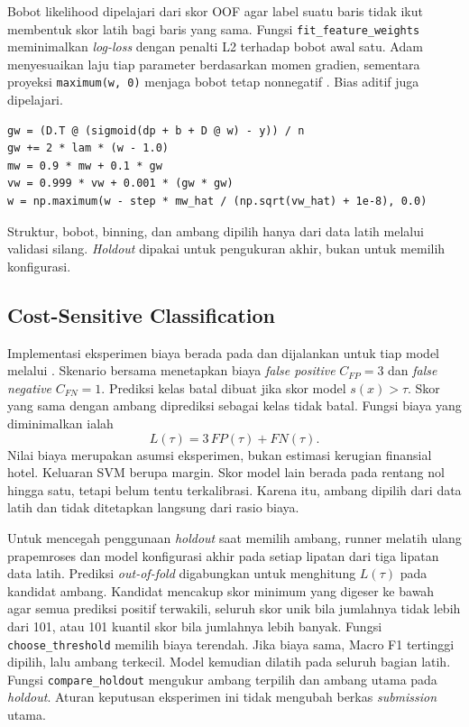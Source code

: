 Bobot likelihood dipelajari dari skor OOF agar label suatu baris tidak ikut
membentuk skor latih bagi baris yang sama. Fungsi \texttt{fit\_feature\_weights}
meminimalkan \textit{log-loss} dengan penalti L2 terhadap bobot awal satu.
Adam menyesuaikan laju tiap parameter berdasarkan momen gradien, sementara
proyeksi \texttt{maximum(w, 0)} menjaga bobot tetap nonnegatif
\cite{zaidi2013alleviating}. Bias aditif juga dipelajari.

\begin{lstlisting}[caption={Pembaruan bobot likelihood KDB dengan Adam},label={lst-nb-adam}]
gw = (D.T @ (sigmoid(dp + b + D @ w) - y)) / n
gw += 2 * lam * (w - 1.0)
mw = 0.9 * mw + 0.1 * gw
vw = 0.999 * vw + 0.001 * (gw * gw)
w = np.maximum(w - step * mw_hat / (np.sqrt(vw_hat) + 1e-8), 0.0)
\end{lstlisting}

Struktur, bobot, binning, dan ambang dipilih hanya dari data latih melalui
validasi silang. \textit{Holdout} dipakai untuk pengukuran akhir, bukan
untuk memilih konfigurasi.

\newpage
\subsection{Cost-Sensitive Classification}
\label{sec:implementasi-cost-sensitive}

Implementasi eksperimen biaya berada pada  dan dijalankan untuk tiap model melalui . Skenario bersama menetapkan biaya \textit{false positive} $C_{FP}=3$ dan \textit{false negative} $C_{FN}=1$. Prediksi kelas batal dibuat jika skor model $s(x)>\tau$. Skor yang sama dengan ambang diprediksi sebagai kelas tidak batal. Fungsi biaya yang diminimalkan ialah
\begin{equation}
    L(\tau)=3\,FP(\tau)+FN(\tau).
\end{equation}
Nilai biaya merupakan asumsi eksperimen, bukan estimasi kerugian finansial hotel. Keluaran SVM berupa margin. Skor model lain berada pada rentang nol hingga satu, tetapi belum tentu terkalibrasi. Karena itu, ambang dipilih dari data latih dan tidak ditetapkan langsung dari rasio biaya.

Untuk mencegah penggunaan \textit{holdout} saat memilih ambang, runner melatih ulang prapemroses dan model konfigurasi akhir pada setiap lipatan dari tiga lipatan data latih. Prediksi \textit{out-of-fold} digabungkan untuk menghitung $L(\tau)$ pada kandidat ambang. Kandidat mencakup skor minimum yang digeser ke bawah agar semua prediksi positif terwakili, seluruh skor unik bila jumlahnya tidak lebih dari 101, atau 101 kuantil skor bila jumlahnya lebih banyak. Fungsi \texttt{choose\_threshold} memilih biaya terendah. Jika biaya sama, Macro F1 tertinggi dipilih, lalu ambang terkecil. Model kemudian dilatih pada seluruh bagian latih. Fungsi \texttt{compare\_holdout} mengukur ambang terpilih dan ambang utama pada \textit{holdout}. Aturan keputusan eksperimen ini tidak mengubah berkas \textit{submission} utama.

